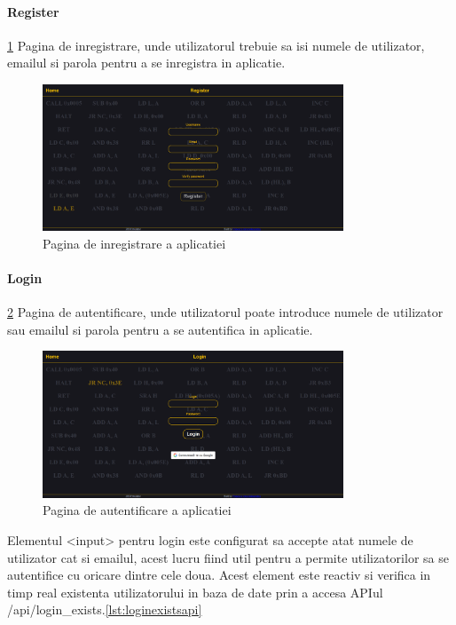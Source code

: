 \documentclass[titlepage,12pt]{article}
\DeclareRobustCommand{\code}[1]{{\ttfamily\small #1}}
\begin{document}
\paragraph {Register} \cref {fig:registerpage} Pagina de inregistrare, unde utilizatorul trebuie sa isi numele de utilizator, emailul si parola pentru a se inregistra in aplicatie.
\begin{figure}[h!]
    \centering
    \includegraphics[width=0.8\textwidth]{images/registerpage.png}
    \caption{Pagina de inregistrare a aplicatiei}
    \label{fig:registerpage}
\end{figure}

\paragraph {Login} \cref {fig:loginpage} Pagina de autentificare, unde utilizatorul poate introduce numele de utilizator sau emailul si parola pentru a se autentifica in aplicatie.
\begin{figure}[h!]
    \centering
    \includegraphics[width=0.8\textwidth]{images/loginpage.png}
    \caption{Pagina de autentificare a aplicatiei}
    \label{fig:loginpage}
\end{figure}

Elementul \code{<input>} pentru login este configurat sa accepte atat numele de utilizator cat si emailul, acest lucru fiind util pentru a permite utilizatorilor sa se autentifice cu oricare dintre cele doua. Acest element este reactiv si verifica in timp real existenta utilizatorului in baza de date prin a accesa APIul \code{/api/login\_exists}.\cref{lst:loginexistsapi}
\end{document}
